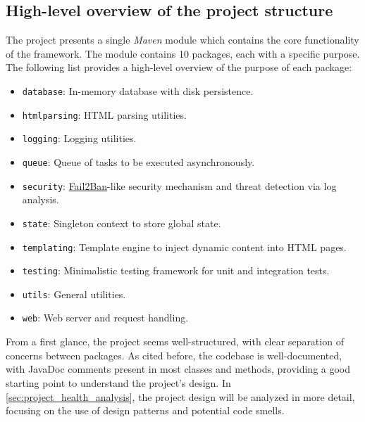 \subsection{High-level overview of the project structure}
\label{sec:project_structure}

The project presents a single \textit{Maven} module which contains the core functionality of the framework. The module contains 10 packages, each with a specific purpose. The following list provides a high-level overview of the purpose of each package:

\vspace{1em}
\noindent
\begin{minipage}{0.5\textwidth}
	\begin{itemize}
		\item \texttt{database}: In-memory database with disk persistence.
		\item \texttt{htmlparsing}: HTML parsing utilities.
		\item \texttt{logging}: Logging utilities.
		\item \texttt{queue}: Queue of tasks to be executed asynchronously.
		\item \texttt{security}: \href{https://github.com/fail2ban/fail2ban}{Fail2Ban}-like security mechanism and threat detection via log analysis.
	\end{itemize}
\end{minipage}
\begin{minipage}{0.5\textwidth}
	\begin{itemize}
		\item \texttt{state}: Singleton context to store global state.
		\item \texttt{templating}: Template engine to inject dynamic content into HTML pages.
		\item \texttt{testing}: Minimalistic testing framework for unit and integration tests.
		\item \texttt{utils}: General utilities.
		\item \texttt{web}: Web server and request handling.
	\end{itemize}
\end{minipage}
\vspace{1em}

\noindent From a first glance, the project seems well-structured, with clear separation of concerns between packages. As cited before, the codebase is well-documented, with JavaDoc comments present in most classes and methods, providing a good starting point to understand the project's design. In \autoref{sec:project_health_analysis}, the project design will be analyzed in more detail, focusing on the use of design patterns and potential code smells.

